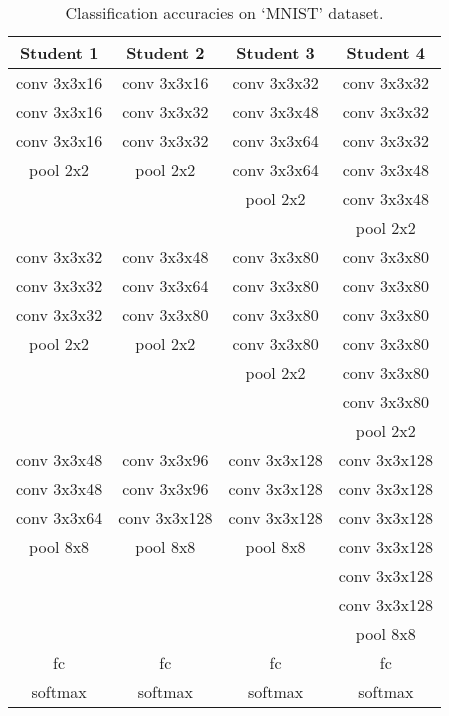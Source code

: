 \documentclass[journal]{IEEEtran}
\begin{document}
\begin{table}[htb]
\renewcommand\arraystretch{1}
\centering
\small
\setlength{\abovecaptionskip}{0.2cm}
\setlength{\belowcaptionskip}{0.2cm}
\caption{Classification accuracies on `MNIST' dataset.}
\begin{tabular}{|c|c|c|c|}
\hline
Student 1  &  Student 2  &  Student 3  &  Student 4  \\
\hline
\hline
conv 3x3x16  &  conv 3x3x16  &  conv 3x3x32  &  conv 3x3x32  \\
conv 3x3x16  &  conv 3x3x32  &  conv 3x3x48  &  conv 3x3x32  \\
conv 3x3x16  &  conv 3x3x32  &  conv 3x3x64  &  conv 3x3x32  \\
pool 2x2     &  pool 2x2     &  conv 3x3x64  &  conv 3x3x48  \\
           &               &  pool 2x2     &  conv 3x3x48  \\
           &               &               &  pool 2x2     \\
\hline
conv 3x3x32  &  conv 3x3x48  &  conv 3x3x80  &  conv 3x3x80  \\
conv 3x3x32  &  conv 3x3x64  &  conv 3x3x80  &  conv 3x3x80  \\
conv 3x3x32  &  conv 3x3x80  &  conv 3x3x80  &  conv 3x3x80  \\
pool 2x2     &  pool 2x2     &  conv 3x3x80  &  conv 3x3x80  \\
           &               &  pool 2x2     &  conv 3x3x80  \\
           &               &               &  conv 3x3x80  \\
           &               &               &  pool 2x2     \\
\hline
conv 3x3x48  &  conv 3x3x96  &  conv 3x3x128 &  conv 3x3x128  \\
conv 3x3x48  &  conv 3x3x96  &  conv 3x3x128 &  conv 3x3x128  \\
conv 3x3x64  &  conv 3x3x128 &  conv 3x3x128 &  conv 3x3x128  \\
pool 8x8     &  pool 8x8     &  pool 8x8     &  conv 3x3x128  \\
           &               &               &  conv 3x3x128  \\
           &               &               &  conv 3x3x128  \\
           &               &               &  pool 8x8      \\
\hline
fc  &  fc  &  fc  &  fc  \\
softmax  &  softmax  &  softmax  &  softmax  \\
\hline
\end{tabular}
\label{tab_arch_4}
\end{table}
\fi

\ifCLASSOPTIONcaptionsoff
  \newpage
\fi




\end{document}
